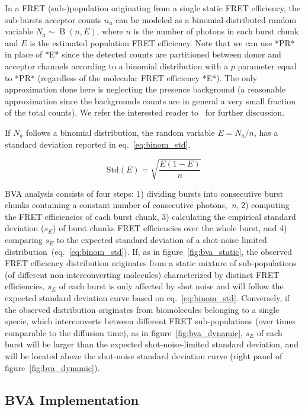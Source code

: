 In a FRET (sub-)population originating from a single static FRET efficiency,
the sub-bursts acceptor counts $n_a$ can be modeled as a binomial-distributed random variable 
$N_a \sim \operatorname{B}(n, E)$, where $n$ is the number of photons in each burst chunk and 
$E$ is the estimated population FRET efficiency. 
Note that we can use *PR* in place of *E* since the detected counts are partitioned 
between donor and acceptor channels according to a binomial distribution with 
a $p$ parameter equal to *PR* (regardless of the molecular FRET efficiency *E*).
The only approximation done here is neglecting the presence background
(a reasonable approximation since the backgrounds counts are in general a 
very small fraction of the total counts). 
We refer the interested reader to~\cite{Torella_2011} for further discussion.

If $N_a$ follows a binomial distribution, the random variable $E = N_a/n$,
has a standard deviation reported in eq.~\ref{eq:binom_std}. 

\begin{equation}
\label{eq:binom_std}
\operatorname{Std(\textit{E})} = {\sqrt{\frac{E(1 - E)}{n}}}
\end{equation}

BVA analysis consists of four steps: 1) dividing bursts into consecutive burst chunks containing a constant number of consecutive photons,~\textit{n}, 2) computing the FRET efficiencies of each burst chunk, 3) calculating the empirical standard deviation ($s_E$) of burst chunks FRET efficiencies over the whole burst, and 4) comparing $s_E$ to the expected standard deviation of a shot-noise limited distribution~(eq.~\ref{eq:binom_std}).
If, as in figure~\ref{fig:bva_static}, the observed FRET efficiency distribution 
originates from a static mixture of sub-populations (of different 
non-interconverting molecules) characterized by distinct FRET efficiencies, 
$s_E$ of each burst is only affected by shot noise and will follow the expected standard deviation curve based on eq.~\ref{eq:binom_std}. 
Conversely, if the observed distribution originates from biomolecules belonging to a single specie, which 
interconverts between different FRET sub-populations (over times comparable to the diffusion 
time), as in figure~\ref{fig:bva_dynamic}, $s_E$ of each burst will be larger than the expected 
shot-noise-limited standard deviation, and will be located above the shot-noise standard 
deviation curve (right panel of figure~\ref{fig:bva_dynamic}).

\subsection{BVA Implementation}

